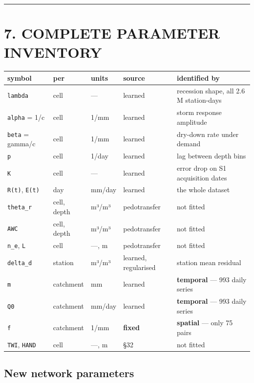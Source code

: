 \documentclass[10pt,a4paper]{article}
\begin{document}
\medskip\hrule\medskip

\section*{7. COMPLETE PARAMETER INVENTORY}

\begin{center}
\footnotesize
\begin{tabularx}{\linewidth}{XXXXX}
\toprule
\textbf{symbol} & \textbf{per} & \textbf{units} & \textbf{source} & \textbf{identified by} \\
\midrule
\texttt{lambda} & cell & — & learned & recession shape, all 2.6 M station-days \\
\texttt{alpha} = 1/c & cell & 1/mm & learned & storm response amplitude \\
\texttt{beta} = gamma/c & cell & 1/mm & learned & dry-down rate under demand \\
\texttt{p} & cell & 1/day & learned & lag between depth bins \\
\texttt{K} & cell & — & learned & error drop on S1 acquisition dates \\
\texttt{R(t)}, \texttt{E(t)} & day & mm/day & learned & the whole dataset \\
\texttt{theta\_r} & cell, depth & m³/m³ & pedotransfer & not fitted \\
\texttt{AWC} & cell, depth & m³/m³ & pedotransfer & not fitted \\
\texttt{n\_e}, \texttt{L} & cell & —, m & pedotransfer & not fitted \\
\texttt{delta\_d} & station & m³/m³ & learned, regularised & station mean residual \\
\texttt{m} & catchment & mm & learned & \textbf{temporal} — 993 daily series \\
\texttt{Q0} & catchment & mm/day & learned & \textbf{temporal} — 993 daily series \\
\texttt{f} & catchment & 1/mm & \textbf{fixed} & \textbf{spatial} — only 75 pairs \\
\texttt{TWI}, \texttt{HAND} & cell & —, m & §32 & not fitted \\
\bottomrule
\end{tabularx}
\end{center}

\subsection*{New network parameters}
\end{document}
